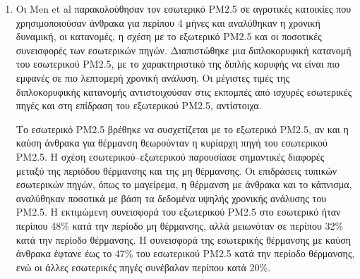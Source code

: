 \begin{enumerate}
    \item Οι Men et al \cite{MEN2021117753} παρακολούθησαν τον εσωτερικό PM2.5 σε αγροτικές κατοικίες που χρησιμοποιούσαν άνθρακα για περίπου 4 μήνες και αναλύθηκαν η χρονική δυναμική, οι κατανομές, η σχέση με το εξωτερικό PM2.5 
    και οι ποσοτικές συνεισφορές των εσωτερικών πηγών. Διαπιστώθηκε μια διπλοκορυφική κατανομή του εσωτερικού PM2.5, με το χαρακτηριστικό της διπλής κορυφής να είναι πιο εμφανές σε πιο λεπτομερή χρονική ανάλυση. 
    Οι μέγιστες τιμές της διπλοκορυφικής κατανομής αντιστοιχούσαν στις εκπομπές από ισχυρές εσωτερικές πηγές και στη επίδραση του εξωτερικού PM2.5, αντίστοιχα.

    Το εσωτερικό PM2.5 βρέθηκε να συσχετίζεται με το εξωτερικό PM2.5, αν και η καύση άνθρακα για θέρμανση θεωρούνταν η κυρίαρχη πηγή του εσωτερικού PM2.5. Η σχέση εσωτερικού–εξωτερικού παρουσίασε 
    σημαντικές διαφορές μεταξύ της περιόδου θέρμανσης και της μη θέρμανσης. Οι επιδράσεις τυπικών εσωτερικών πηγών, όπως το μαγείρεμα, η θέρμανση με άνθρακα και το κάπνισμα, αναλύθηκαν ποσοτικά με βάση τα δεδομένα υψηλής χρονικής ανάλυσης του PM2.5.
     Η εκτιμώμενη συνεισφορά του εξωτερικού PM2.5 στο εσωτερικό ήταν περίπου 48\% κατά την περίοδο μη θέρμανσης, αλλά μειωνόταν σε περίπου 32\% κατά την περίοδο θέρμανσης. Η συνεισφορά της εσωτερικής θέρμανσης με καύση άνθρακα έφτανε έως το 47\% του εσωτερικού PM2.5 
     κατά την περίοδο θέρμανσης, ενώ οι άλλες εσωτερικές πηγές συνέβαλαν περίπου κατά 20\%.


    
\end{enumerate}
